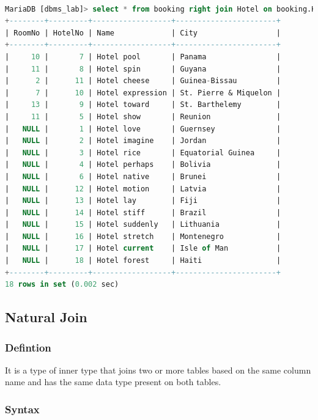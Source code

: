 \documentclass[11pt]{article}
\begin{document}
\begin{lstlisting}[language=sql]

MariaDB [dbms_lab]> select * from booking right join Hotel on booking.HotelNo = Hotel.HotelNo;
+--------+---------+------------------+-----------------------+
| RoomNo | HotelNo | Name             | City                  |
+--------+---------+------------------+-----------------------+
|     10 |       7 | Hotel pool       | Panama                |
|     11 |       8 | Hotel spin       | Guyana                |
|      2 |      11 | Hotel cheese     | Guinea-Bissau         |
|      7 |      10 | Hotel expression | St. Pierre & Miquelon |
|     13 |       9 | Hotel toward     | St. Barthelemy        |
|     11 |       5 | Hotel show       | Reunion               |
|   NULL |       1 | Hotel love       | Guernsey              |
|   NULL |       2 | Hotel imagine    | Jordan                |
|   NULL |       3 | Hotel rice       | Equatorial Guinea     |
|   NULL |       4 | Hotel perhaps    | Bolivia               |
|   NULL |       6 | Hotel native     | Brunei                |
|   NULL |      12 | Hotel motion     | Latvia                |
|   NULL |      13 | Hotel lay        | Fiji                  |
|   NULL |      14 | Hotel stiff      | Brazil                |
|   NULL |      15 | Hotel suddenly   | Lithuania             |
|   NULL |      16 | Hotel stretch    | Montenegro            |
|   NULL |      17 | Hotel current    | Isle of Man           |
|   NULL |      18 | Hotel forest     | Haiti                 |
+--------+---------+------------------+-----------------------+
18 rows in set (0.002 sec)
\end{lstlisting}

\subsection{Natural Join}

\subsubsection*{Defintion}

It is a type of inner type that joins two or more tables based on the same column name and has the same data type present on both tables.

\subsubsection*{Syntax}
\end{document}

